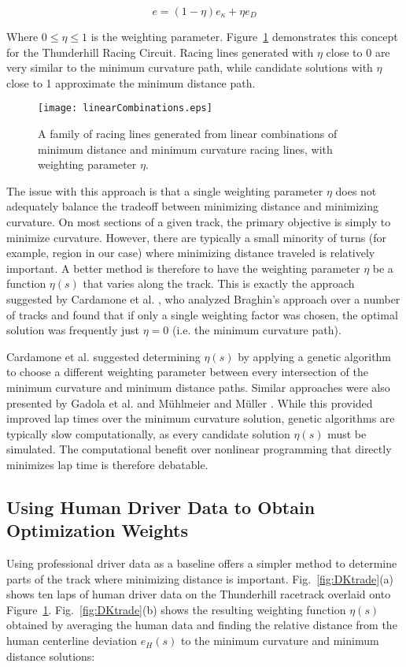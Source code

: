 \begin{equation}
e = (1-\eta)e_\kappa + \eta e_D
\end{equation}

Where $0 \leq \eta \leq 1$ is the weighting parameter. Figure~\ref{fig:linearCombos} demonstrates this concept for the Thunderhill Racing Circuit. Racing lines generated
with $\eta$ close to 0 are very similar to the minimum curvature path, while candidate solutions with $\eta$ close to 1 approximate the minimum distance path. 

 \begin{figure}
\centering
\texttt{[image: linearCombinations.eps]}
\caption{A family of racing lines generated from linear combinations of minimum distance and minimum curvature racing lines, with weighting parameter $\eta$.}
\label{fig:linearCombos}
\end{figure}

The issue with this approach is that a single weighting parameter $\eta$ does not adequately balance the tradeoff between minimizing distance and minimizing curvature.
On most sections of a given track, the primary objective is simply to minimize curvature. However, there are typically a small minority of turns (for example, region  in our 
case) where minimizing distance traveled is relatively important. A better method is therefore to have the weighting parameter $\eta$ be a function $\eta(s)$ that varies
along the track. This is exactly the approach suggested by Cardamone et al. \cite{cardamone}, who analyzed Braghin's approach over a number of tracks and found that
if only a single weighting factor was chosen, the optimal solution was frequently just $\eta = 0$ (i.e. the minimum curvature path).  

Cardamone et al. suggested determining $\eta(s)$ by applying a genetic algorithm to choose a different weighting parameter between every intersection of the minimum curvature
and minimum distance paths. Similar approaches were also presented by Gadola et al. \cite{gadola} and M{\"u}hlmeier and M{\"u}ller \cite{mully}.
While this provided improved lap times over the minimum curvature solution, genetic algorithms are typically slow computationally, as every candidate solution $\eta(s)$ must be
 simulated. The computational benefit over nonlinear programming that directly minimizes lap time is therefore debatable. 
 
\subsection{Using Human Driver Data to Obtain Optimization \newline Weights}
Using professional driver data as a baseline offers a simpler method to determine parts of the track where minimizing distance is important. Fig.~\ref{fig:DKtrade}(a) shows ten
laps of human driver data on the Thunderhill racetrack overlaid onto Figure~\ref{fig:linearCombos}. Fig.~\ref{fig:DKtrade}(b) shows the resulting weighting
function $\eta(s)$ obtained by averaging the human data and finding the relative distance from the human centerline deviation $e_H(s)$ to the minimum curvature and
minimum distance solutions:

